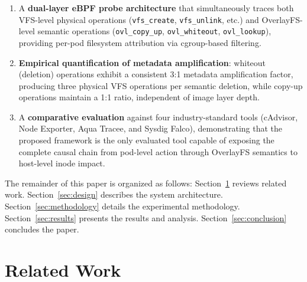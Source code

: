 \documentclass[conference]{IEEEtran}
\begin{document}
\begin{enumerate}
    \item A \textbf{dual-layer eBPF probe architecture} that simultaneously traces both VFS-level physical operations (\texttt{vfs\_create}, \texttt{vfs\_unlink}, etc.) and OverlayFS-level semantic operations (\texttt{ovl\_copy\_up}, \texttt{ovl\_whiteout}, \texttt{ovl\_lookup}), providing per-pod filesystem attribution via cgroup-based filtering.
    
    \item \textbf{Empirical quantification of metadata amplification}: whiteout (deletion) operations exhibit a consistent 3:1 metadata amplification factor, producing three physical VFS operations per semantic deletion, while copy-up operations maintain a 1:1 ratio, independent of image layer depth.
    
    \item A \textbf{comparative evaluation} against four industry-standard tools (cAdvisor, Node Exporter, Aqua Tracee, and Sysdig Falco), demonstrating that the proposed framework is the only evaluated tool capable of exposing the complete causal chain from pod-level action through OverlayFS semantics to host-level inode impact.
\end{enumerate}

The remainder of this paper is organized as follows: Section~\ref{sec:related} reviews related work. Section~\ref{sec:design} describes the system architecture. Section~\ref{sec:methodology} details the experimental methodology. Section~\ref{sec:results} presents the results and analysis. Section~\ref{sec:conclusion} concludes the paper.


\section{Related Work}
\label{sec:related}



\end{document}
